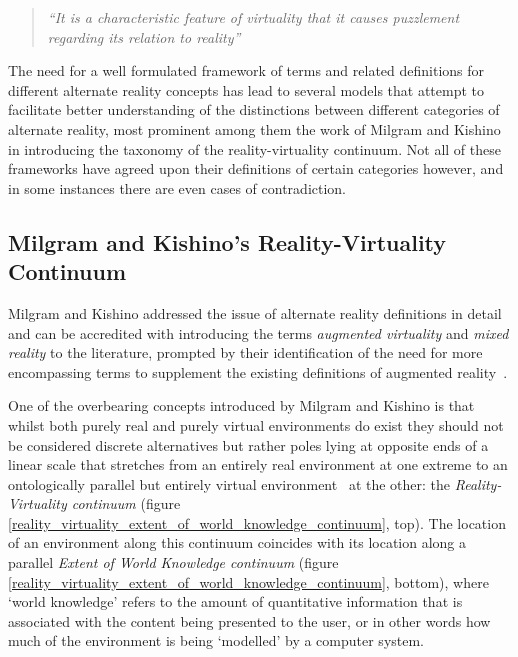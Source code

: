 \begin{quote}
	\textit{``It is a characteristic feature of virtuality that it causes puzzlement regarding its relation to reality''}~\cite{Brey2014}
\end{quote}

The need for a well formulated framework of terms and related definitions for different alternate reality concepts has lead to several models that attempt to facilitate better understanding of the distinctions between different categories of alternate reality, most prominent among them the work of Milgram and Kishino in introducing the taxonomy of the reality-virtuality continuum. Not all of these frameworks have agreed upon their definitions of certain categories however, and in some instances there are even cases of contradiction.


\subsection{Milgram and Kishino's Reality-Virtuality Continuum}
\label{milgram&kishino}
Milgram and Kishino addressed the issue of alternate reality definitions in detail and can be accredited with introducing the terms \textit{augmented virtuality} and \textit{mixed reality} to the literature, prompted by their identification of the need for more encompassing terms to supplement the existing definitions of augmented reality~\cite{Milgram1999}.


One of the overbearing concepts introduced by Milgram and Kishino is that whilst both purely real and purely virtual environments do exist they should not be considered discrete alternatives but rather poles lying at opposite ends of a linear scale that stretches from an entirely real environment at one extreme to an ontologically parallel but entirely virtual environment~\cite{Qvortrup2002} at the other: the \textit{Reality-Virtuality continuum} (figure \ref{reality_virtuality_extent_of_world_knowledge_continuum}, top). The location of an environment along this continuum coincides with its location along a parallel \textit{Extent of World Knowledge continuum} (figure \ref{reality_virtuality_extent_of_world_knowledge_continuum}, bottom), where `world knowledge' refers to the amount of quantitative information that is associated with the content being presented to the user, or in other words how much of the environment is being `modelled' by a computer system.

